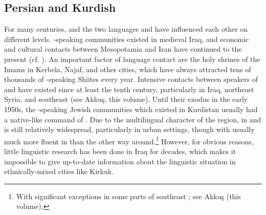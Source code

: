 \documentclass[output=paper]{langsci/langscibook}
\begin{document}
  \subsection{Persian and Kurdish} \label{persian} 
For many centuries,  and the two   languages  and  have influenced each other on different levels. -speaking communities existed in medieval Iraq, and economic and cultural contacts between Mesopotamia and Iran have continued to the present (cf. \citealt{Gazsi2011}). An important factor of language contact are the holy shrines of the Imams in Kerbela, Najaf, and other  cities, which have always attracted tens of thousands of -speaking Shiites every year. Intensive contacts between speakers of  and  have existed since at least the tenth century, particularly in  Iraq, northeast Syria, and southeast  (see Akkuş, this volume). Until their exodus in the early 1950s, the -speaking Jewish communities which existed in  Kurdistan usually had a native-like command of  \citep[12]{Jastrow1990chapter}. Due to the multilingual character of the region,  in  and  is still relatively widespread, particularly in urban settings, though with  usually much more fluent in  than the other way around.\footnote{With significant exceptions in some parts of southeast ; see Akkuş (this volume).} However, for obvious reasons, little linguistic research has been done in Iraq for decades, which makes it impossible to give up-to-date information about the linguistic situation in ethnically-mixed cities like Kirkuk.
\end{document}
